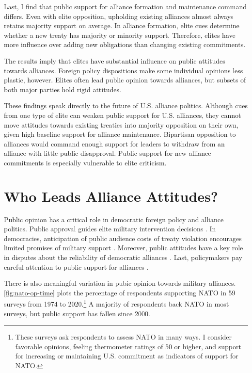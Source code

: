 \documentclass[12pt]{article}
\begin{document}
Last, I find that public support for alliance formation and maintenance command differs.
Even with elite opposition, upholding existing alliances almost always retains majority support on average. 
In alliance formation, elite cues determine whether a new treaty has majority or minority support. 
Therefore, elites have more influence over adding new obligations than changing existing commitments. 


The results imply that elites have substantial influence on public attitudes towards alliances. 
Foreign policy dispositions make some individual opinions less plastic, however. 
Elites often lead public opinion towards alliances, but subsets of both major parties hold rigid attitudes.


These findings speak directly to the future of U.S. alliance politics. 
Although cues from one type of elite can weaken public support for U.S. alliances, they cannot move attitudes towards existing treaties into majority opposition on their own, given high baseline support for alliance maintenance.
Bipartisan opposition to alliances would command enough support for leaders to withdraw from an alliance with little public disapproval.  
Public support for new alliance commitments is especially vulnerable to elite criticism. 



\section{Who Leads Alliance Attitudes?}


Public opinion has a critical role in democratic foreign policy and alliance politics.
Public approval guides elite military intervention decisions \citep{Tomzetal2020, LinGreenberg2021}. 
In democracies, anticipation of public audience costs of treaty violation encourages limited promises of military support \citep{Chibaetal2015, FjelstulReiter2019}. 
Moreover, public attitudes have a key role in disputes about the reliability of democratic alliances \citep{Gaubatz1996, GartzkeGleditsch2004}. 
Last, policymakers pay careful attention to public support for alliances \citep{Sayle2019}. 


There is also meaningful variation in pubic opinion towards military alliances. 
\autoref{fig:nato-op-time} plots the percentage of respondents supporting NATO in 59 surveys from 1974 to 2020.\footnote{These surveys ask respondents to assess NATO in many ways. I consider favorable opinions, feeling thermometer ratings of 50 or higher, and support for increasing or maintaining U.S. commitment as indicators of support for NATO.} 
A majority of respondents back NATO in most surveys, but public support has fallen since 2000.  
\end{document}
